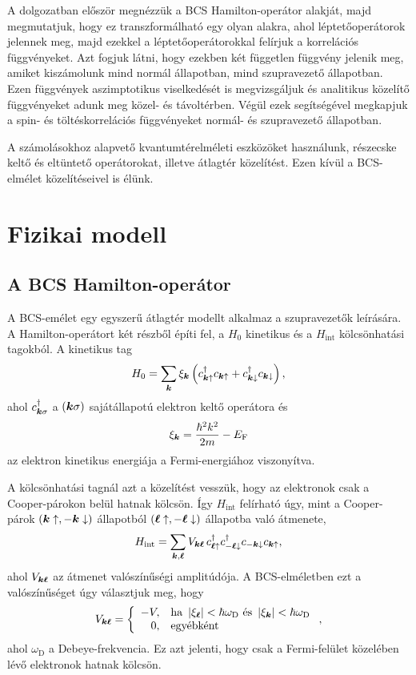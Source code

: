 \documentclass[a4paper,12pt,titlepage]{article}
\newcommand{\KK}{{\vb*{k}}}
\newcommand{\LL}{{\vb*{\ell}}}
\newcommand{\EF}{{E_\text{F}}}
\begin{document}
A dolgozatban először megnézzük a BCS Hamilton-operátor alakját, majd megmutatjuk, hogy ez transzformálható egy olyan alakra, ahol léptetőoperátorok jelennek meg, majd ezekkel a léptetőoperátorokkal felírjuk a korrelációs függvényeket.  Azt fogjuk látni, hogy ezekben két független függvény jelenik meg, amiket kiszámolunk mind normál állapotban, mind szupravezető állapotban.  Ezen függvények aszimptotikus viselkedését is megvizsgáljuk és analitikus közelítő függvényeket adunk meg közel- és távoltérben.  Végül ezek segítségével megkapjuk a spin- és töltéskorrelációs függvényeket normál- és szupravezető állapotban.

A számolásokhoz alapvető kvantumtérelméleti eszközöket használunk, részecske keltő és eltüntető operátorokat, illetve átlagtér közelítést.  Ezen kívül a BCS-elmélet közelítéseivel is élünk.



\section{Fizikai modell}

\subsection{A BCS Hamilton-operátor}

A BCS-emélet egy egyszerű átlagtér modellt alkalmaz a szupravezetők leírására.  A Hamilton-operátort két részből építi fel, a $H_0$ kinetikus és a $H_\text{int}$ kölcsönhatási tagokból.  A kinetikus tag
\begin{equation}
	H_0 = \sum\limits_\KK \xi_\KK \left( c_{\KK \uparrow}^\dagger c_{\KK \uparrow} + c_{\KK \downarrow}^\dagger c_{\KK \downarrow} \right),
\end{equation}
ahol $c_{\KK \sigma}^\dagger$ a $\left( \KK \sigma \right)$ sajátállapotú elektron keltő operátora és
$$ \xi_\KK = \frac{\hbar^2 k^2}{2 m} - \EF $$
az elektron kinetikus energiája a Fermi-energiához viszonyítva.

A kölcsönhatási tagnál azt a közelítést vesszük, hogy az elektronok csak a Cooper-párokon belül hatnak kölcsön.  Így $H_\text{int}$ felírható úgy, mint a Cooper-párok $\left( \KK \uparrow, -\KK \downarrow \right)$ állapotból $\left( \LL \uparrow, -\LL \downarrow \right)$ állapotba való átmenete,
\begin{equation} \label{H-int-def}
	H_\text{int} = \sum\limits_{\KK, \LL} V_{\KK \LL} \, c_{\LL \uparrow}^\dagger c_{-\LL \downarrow}^\dagger c_{-\KK \downarrow} c_{\KK \uparrow},
\end{equation}
ahol $V_{\KK \LL}$ az átmenet valószínűségi amplitúdója.  A BCS-elméletben ezt a valószínűséget úgy választjuk meg, hogy
$$ V_{\KK \LL} = \left\{ \begin{array}{rl}
	-V, & \text{ha } \left| \xi_\LL \right| < \hbar \omega_\text{D} \text{ és } \left| \xi_\KK \right| < \hbar \omega_\text{D} \\
	0, & \text{egyébként}
\end{array} \right. , $$
ahol $\omega_\text{D}$ a Debeye-frekvencia.  Ez azt jelenti, hogy csak a Fermi-felület közelében lévő elektronok hatnak kölcsön.
\end{document}
